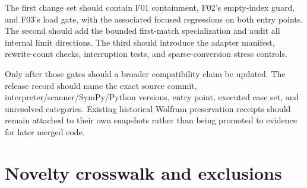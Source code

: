 \documentclass[11pt,letterpaper]{article}
\begin{document}
The first change set should contain F01 containment, F02's empty-index guard, and F03's load gate, with the associated focused regressions on both entry points. The second should add the bounded first-match specialization and audit all internal limit directions. The third should introduce the adapter manifest, rewrite-count checks, interruption tests, and sparse-conversion stress controls.

Only after those gates should a broader compatibility claim be updated. The release record should name the exact source commit, interpreter/scanner/SymPy/Python versions, entry point, executed case set, and unresolved categories. Existing historical Wolfram preservation receipts should remain attached to their own snapshots rather than being promoted to evidence for later merged code.

\section{Novelty crosswalk and exclusions}
\label{sec:novelty}
\end{document}
